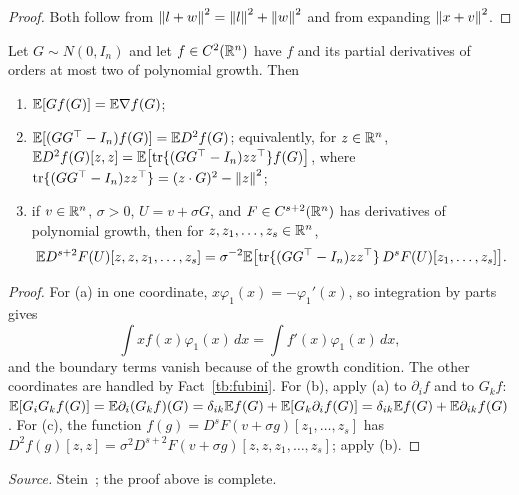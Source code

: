 \begin{proof}
Both follow from \(\left\lVert l+w\right\rVert^2=\left\lVert l\right\rVert^2+\left\lVert w\right\rVert^2\) and from expanding
\(\left\lVert x+v\right\rVert^2\).
\end{proof}


\begin{fact}\label{tb:stein}
Let \(G\sim N(0,I_n)\) and let \(f\in C^2(\mathbb R^n)\) have \(f\) and its partial
derivatives of orders at most two of polynomial growth. Then
\begin{enumerate}
\item[(a)] \(\mathbb E[Gf(G)]=\mathbb E\nabla f(G)\);
\item[(b)] \(\mathbb E[(GG^\top-I_n)f(G)]=\mathbb E D^2f(G)\); equivalently, for \(z\in\mathbb R^n\),
\(\mathbb E D^2f(G)[z,z]=\mathbb E\bigl[\operatorname{tr}\{(GG^\top-I_n)zz^\top\}f(G)\bigr]\), where
\(\operatorname{tr}\{(GG^\top-I_n)zz^\top\}=(z\cdot G)^2-\left\lVert z\right\rVert^2\);
\item[(c)] if \(v\in\mathbb R^n\), \(\sigma>0\), \(U=v+\sigma G\), and
\(F\in C^{s+2}(\mathbb R^n)\) has derivatives of polynomial growth, then for
\(z,z_1,\ldots,z_s\in\mathbb R^n\),
\[
 \mathbb E D^{s+2}F(U)[z,z,z_1,\ldots,z_s]
 =\sigma^{-2}\mathbb E\bigl[\operatorname{tr}\{(GG^\top-I_n)zz^\top\}\,
 D^sF(U)[z_1,\ldots,z_s]\bigr].
\]
\end{enumerate}
\end{fact}

\begin{proof}
For (a) in one coordinate, \(x\varphi_1(x)=-\varphi_1'(x)\), so integration by
parts gives
\[\int xf(x)\varphi_1(x)\,dx=\int f'(x)\varphi_1(x)\,dx,\]
and the boundary terms vanish because of the growth condition. The other coordinates
are handled by Fact~\ref{tb:fubini}. For (b), apply (a) to \(\partial_if\) and
to \(G_kf\): \(\mathbb E[G_iG_kf(G)]=\mathbb E\partial_i(G_kf)(G)=\delta_{ik}\mathbb E f(G)
+\mathbb E[G_k\partial_if(G)]=\delta_{ik}\mathbb E f(G)+\mathbb E\partial_{ik}f(G)\). For (c), the
function \(f(g)=D^sF(v+\sigma g)[z_1,\ldots,z_s]\) has
\(D^2f(g)[z,z]=\sigma^2D^{s+2}F(v+\sigma g)[z,z,z_1,\ldots,z_s]\); apply (b).
\end{proof}

\emph{Source.} Stein~; the proof above is complete.

